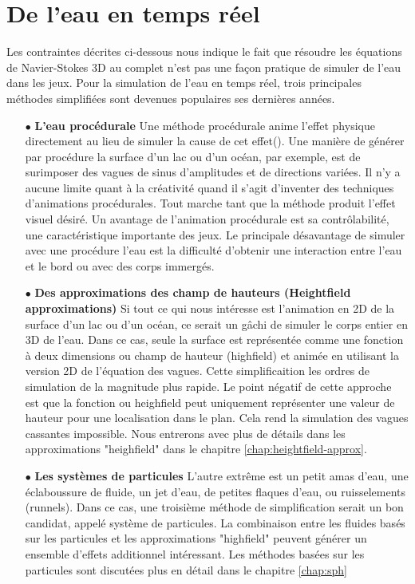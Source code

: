 \documentclass[11pt]{report}
\begin{document}
\section{De l'eau en temps réel}

Les contraintes décrites ci-dessous nous indique le fait que résoudre les équations de Navier-Stokes 3D au complet n'est pas une  façon pratique de simuler de l'eau dans les jeux. Pour la simulation de l'eau en temps réel, trois principales méthodes simplifiées sont devenues populaires ses dernières années.

\begin{enumerate}

\item[$\bullet$] \textbf{L'eau procédurale} Une méthode procédurale anime l'effet physique directement au lieu de simuler la cause de cet effet(\cite{fournier-1986}\cite{hinsinger-2002}). Une manière de générer par procédure la surface d'un lac ou d'un océan, par exemple, est de surimposer des vagues de sinus d'amplitudes et de directions variées. Il n'y a aucune limite quant à la créativité quand il s'agit d'inventer des techniques d'animations procédurales. Tout marche tant que la méthode produit l'effet visuel désiré. Un avantage de l'animation procédurale est sa contrôlabilité, une caractéristique importante des jeux. Le principale désavantage de simuler avec une procédure l'eau est la difficulté d'obtenir une interaction entre l'eau et le bord ou avec des corps immergés.

\item[$\bullet$] \textbf{Des approximations des champ de hauteurs (Heightfield approximations)} Si tout ce qui nous intéresse est l'animation en 2D de la surface d'un lac ou d'un océan, ce serait un gâchi de simuler le corps entier en 3D de l'eau. Dans ce cas, seule la surface est représentée comme une fonction à deux dimensions ou champ de hauteur (highfield) et animée en utilisant la version 2D de l'équation des vagues. Cette simplificaition les ordres de simulation de la magnitude plus rapide. Le point négatif de cette approche est que la fonction ou heighfield peut uniquement représenter une valeur de hauteur pour une localisation dans le plan. Cela rend la simulation des vagues cassantes impossible. Nous entrerons avec plus de détails dans les approximations "heighfield" dans le chapitre \ref{chap:heightfield-approx}.

\item[$\bullet$] \textbf{Les systèmes de particules} L'autre extrême est un petit amas d'eau, une éclaboussure de fluide, un jet d'eau, de petites flaques d'eau, ou ruisselements (runnels). Dans ce cas, une troisième méthode de simplification serait un bon candidat, appelé système de particules. La combinaison entre les fluides basés sur les particules et les approximations "highfield" peuvent générer un ensemble d'effets additionnel intéressant. Les méthodes basées sur les particules sont discutées plus en détail dans le chapitre \ref{chap:sph}


\end{enumerate}
\end{document}
